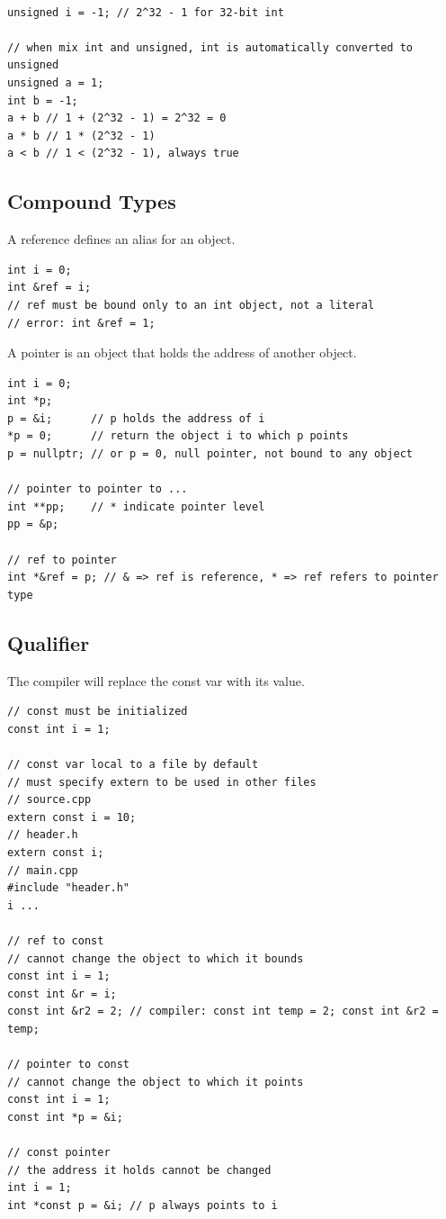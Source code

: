 \documentclass{article}
\begin{document}
\begin{definition}~
    \label{def:type-conversion}
    \begin{verbatim}
unsigned i = -1; // 2^32 - 1 for 32-bit int

// when mix int and unsigned, int is automatically converted to unsigned
unsigned a = 1;
int b = -1;
a + b // 1 + (2^32 - 1) = 2^32 = 0
a * b // 1 * (2^32 - 1)
a < b // 1 < (2^32 - 1), always true
\end{verbatim}
\end{definition}

\subsection{Compound Types}
\begin{definition}[reference]
    A reference defines an alias for an object.
    \begin{verbatim}
int i = 0;
int &ref = i;
// ref must be bound only to an int object, not a literal
// error: int &ref = 1;
\end{verbatim}
\end{definition}

\begin{definition}[pointer]
    A pointer is an object that holds the address of another object.
    \begin{verbatim}
int i = 0;
int *p;
p = &i;      // p holds the address of i
*p = 0;      // return the object i to which p points
p = nullptr; // or p = 0, null pointer, not bound to any object

// pointer to pointer to ...
int **pp;    // * indicate pointer level
pp = &p;

// ref to pointer
int *&ref = p; // & => ref is reference, * => ref refers to pointer type
\end{verbatim}
\end{definition}

\subsection{Qualifier}
\begin{definition}[const]
    The compiler will replace the const var with its value.
    \begin{verbatim}
// const must be initialized
const int i = 1;

// const var local to a file by default
// must specify extern to be used in other files
// source.cpp
extern const i = 10;
// header.h
extern const i;
// main.cpp
#include "header.h"
i ...

// ref to const
// cannot change the object to which it bounds
const int i = 1;
const int &r = i;
const int &r2 = 2; // compiler: const int temp = 2; const int &r2 = temp;

// pointer to const
// cannot change the object to which it points
const int i = 1;
const int *p = &i;

// const pointer
// the address it holds cannot be changed
int i = 1;
int *const p = &i; // p always points to i
\end{verbatim}
\end{definition}
\end{document}
